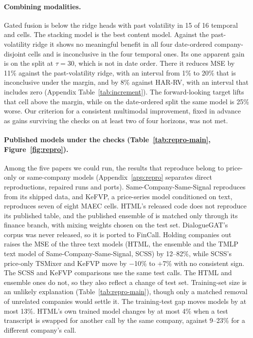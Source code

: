 \paragraph{Combining modalities.}
Gated fusion is below the ridge heads with past volatility in 15 of 16 temporal
and \tickerdisjoint{} cells. The
stacking model is the best content model. Against the past-volatility ridge it
shows no meaningful benefit in all four date-ordered company-disjoint cells and is
inconclusive in the four temporal ones. Its one apparent gain is on the
\tickerdisjoint{} split at $\tau{=}30$, which is not in date order. There it
reduces MSE by 11\% against the past-volatility ridge, with an interval from 1\%
to 20\% that is inconclusive under the margin, and by 8\% against HAR-RV, with an
interval that includes zero (Appendix Table~\ref{tab:increment}). The forward-looking
target lifts that cell above the margin, while on the date-ordered split the same
model is 25\% worse. Our criterion for a consistent multimodal improvement,
fixed in advance as gains surviving the checks on at least two of four
horizons, was not met.

\paragraph{Published models under the checks (Table~\ref{tab:repro-main}, Figure~\ref{fig:repro}).}
Among the five papers we could run, the results that reproduce belong to
price-only or same-company models (Appendix~\ref{app:repro} separates direct
reproductions, repaired runs and ports). Same-Company-Same-Signal reproduces from
its shipped data, and KeFVP, a price-series model conditioned on text,
reproduces seven of eight MAEC cells. HTML's released code does not reproduce its published table,
and the published ensemble of \citet{sawhney2020mm} is matched only through its
finance branch, with mixing weights chosen on the test set. DialogueGAT's corpus
was never released, so it is ported to FinCall. Holding companies out raises the
MSE of the three text models (HTML, the ensemble and the TMLP text model of
Same-Company-Same-Signal, SCSS) by 12--82\%, while SCSS's price-only TSMixer and
KeFVP move by $-$10\% to $+$7\% with no consistent sign. The SCSS and KeFVP
comparisons use the same test calls. The HTML and ensemble ones do not, so they also reflect a change
of test set. Training-set size is an unlikely explanation (Table~\ref{tab:repro-main}),
though only a matched removal of unrelated companies would settle it. The
training-test gap moves models by at most 13\%. HTML's own
trained model changes by at most 4\% when a test transcript is swapped for
another call by the same company, against 9--23\% for a different company's call.

